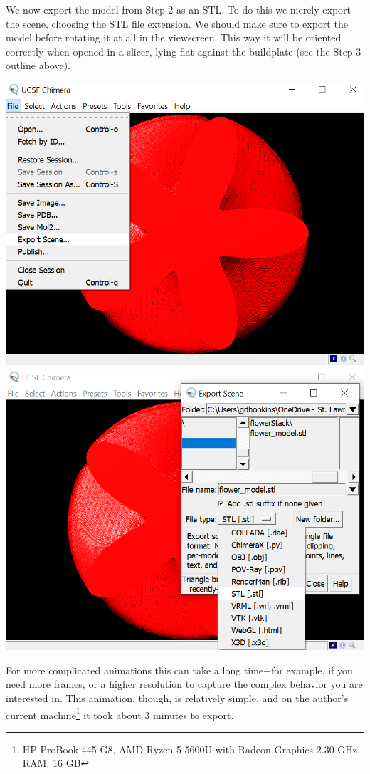 \documentclass[12 pt]{article}
\begin{document}
We now export the model from Step 2 as an STL.  To do this we merely export the scene, choosing the STL file extension.  We should make sure to export the model before rotating it at all in the viewscreen.  This way it will be oriented correctly when opened in a slicer, lying flat against the buildplate (see the Step 3 outline above).
\begin{center}
    \includegraphics[width = .45\textwidth]{images/Chimera_Export1.png}
    \hspace{10pt}
    \includegraphics[width = .45\textwidth]{images/Chimera_Export2.png}
\end{center}
For more complicated animations this can take a long time$-$for example, if you need more frames, or a higher resolution to capture the complex behavior you are interested in.  This animation, though, is relatively simple, and on the author's current machine\footnote{HP ProBook 445 G8, AMD Ryzen 5 5600U with Radeon Graphics 2.30 GHz, RAM: 16 GB} it took about 3 minutes to export.\\
\end{document}
